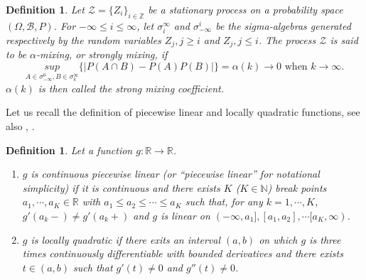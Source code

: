 \documentclass[10pt,twoside]{article}
\numberwithin{equation}{section}
\newtheorem{Def}[thm]{Definition}
\newcommand{\R}{\ensuremath{\mathbb{R}}}
\newcommand{\Z}{\ensuremath{\mathbb{Z}}}
\newcommand{\N}{\ensuremath{\mathbb{N}}}
\renewcommand{\quote}[1]{``#1''}
\begin{document}
\begin{Def}
Let $\mathcal{Z} = \{Z_i\}_{i\in \Z}$ be a stationary process on a probability space $(\Omega, \mathcal{B}, P)$. For $-\infty \leq i \leq \infty$, let $\sigma_{i}^{\infty}$ and $\sigma_{-\infty}^i$ be the sigma-algebras generated respectively by the random variables $Z_j, j \ge i$ and $Z_j, j\leq i$. The process $\mathcal{Z}$ is said to be $\alpha$-mixing, or strongly mixing, if
%
\begin{equation*}
\underset{A \in \sigma_{-\infty}^0, B \in\sigma_k^{\infty}}{sup} \{ |P(A \cap B) - P(A)P(B) |\} = \alpha(k) \to 0 \text{ when } k \to \infty. 
\end{equation*}
$\alpha(k)$ is then called the strong mixing coefficient.

\end{Def}
%
%
Let us recall the definition of piecewise linear and locally quadratic functions, see also  \cite{ohn2019smooth}, \cite{ohn2022nonconvex}.
%
\begin{Def}\label{def_pwl_quad}
Let a function $g: \R \rightarrow \R$.
\begin{enumerate}
\item $g$ is continuous piecewise linear (or \quote{piecewise linear} for notational simplicity) if it is continuous and there exists $K$ ($K\in \N$) break points $a_1,\cdots, a_K \in \R$ with $a_1 \leq a_2\leq\cdots \leq a_K $ such that, for any $k=1,\cdots,K$, $g'(a_k-) \neq g'(a_k+)$ and $g$ is linear on $(-\infty,a_1], [a_1,a_2],\cdots [a_K,\infty)$.
\item $g$ is locally quadratic if there exits an interval $(a,b)$ on which $g$ is three times continuously differentiable with bounded derivatives and there exists $t \in (a,b)$ such that $g'(t) \neq 0$ and $g''(t) \neq 0$.
\end{enumerate} 
%
\end{Def}

\medskip
\end{document}
